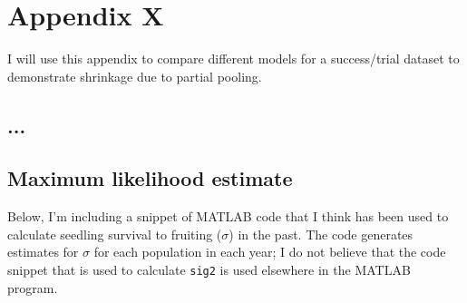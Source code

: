 \documentclass[12pt, oneside, titlepage]{article}   	%
\begin{document}
 

\section*{Appendix X}

I will use this appendix to compare different models for a success/trial dataset to demonstrate shrinkage due to partial pooling.

\subsection*{...}

\subsection*{Maximum likelihood estimate}

Below, I'm including a snippet of MATLAB code that I think has been used to calculate seedling survival to fruiting ($\sigma$) in the past. The code generates estimates for $\sigma$ for each population in each year; I do not believe that the code snippet that is used to calculate \verb|sig2| is used elsewhere in the MATLAB program. 
\end{document}
